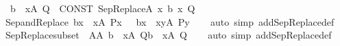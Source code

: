 \begin{isabellebody}
\isamarkupfalse%
\isanewline
\ \ {\isachardoublequoteopen}{\isacharbraceleft}{\kern0pt}b\ {\isachardot}{\kern0pt}{\isachardot}{\kern0pt}\ x{\isasymin}A{\isacharcomma}{\kern0pt}\ Q{\isacharbraceright}{\kern0pt}{\isachardoublequoteclose}\ {\isacharequal}{\kern0pt}{\isachargreater}{\kern0pt}\ {\isachardoublequoteopen}CONST\ SepReplace{\isacharparenleft}{\kern0pt}A{\isacharcomma}{\kern0pt}\ {\isasymlambda}x{\isachardot}{\kern0pt}\ b{\isacharcomma}{\kern0pt}\ {\isasymlambda}x{\isachardot}{\kern0pt}\ Q{\isacharparenright}{\kern0pt}{\isachardoublequoteclose}\isanewline
\isanewline
{}\isamarkupfalse%
\ Sep{\isacharunderscore}{\kern0pt}and{\isacharunderscore}{\kern0pt}Replace{\isacharcolon}{\kern0pt}\ {\isachardoublequoteopen}{\isacharbraceleft}{\kern0pt}b{\isacharparenleft}{\kern0pt}x{\isacharparenright}{\kern0pt}\ {\isachardot}{\kern0pt}{\isachardot}{\kern0pt}\ x{\isasymin}A{\isacharcomma}{\kern0pt}\ P{\isacharparenleft}{\kern0pt}x{\isacharparenright}{\kern0pt}\ {\isacharbraceright}{\kern0pt}\ {\isacharequal}{\kern0pt}\ {\isacharbraceleft}{\kern0pt}b{\isacharparenleft}{\kern0pt}x{\isacharparenright}{\kern0pt}\ {\isachardot}{\kern0pt}\ x{\isasymin}{\isacharbraceleft}{\kern0pt}y{\isasymin}A{\isachardot}{\kern0pt}\ P{\isacharparenleft}{\kern0pt}y{\isacharparenright}{\kern0pt}{\isacharbraceright}{\kern0pt}{\isacharbraceright}{\kern0pt}{\isachardoublequoteclose}\isanewline
%
\isadelimproof
\ \ %
\endisadelimproof
%
\isatagproof
{}\isamarkupfalse%
\ {\isacharparenleft}{\kern0pt}auto\ simp\ add{\isacharcolon}{\kern0pt}SepReplace{\isacharunderscore}{\kern0pt}def{\isacharparenright}{\kern0pt}%
\endisatagproof
{\isafoldproof}%
%
\isadelimproof
\isanewline
%
\endisadelimproof
\isanewline
{}\isamarkupfalse%
\ SepReplace{\isacharunderscore}{\kern0pt}subset\ {\isacharcolon}{\kern0pt}\ {\isachardoublequoteopen}A{\isasymsubseteq}A{\isacharprime}{\kern0pt}{\isasymLongrightarrow}\ {\isacharbraceleft}{\kern0pt}b\ {\isachardot}{\kern0pt}{\isachardot}{\kern0pt}\ x{\isasymin}A{\isacharcomma}{\kern0pt}\ Q{\isacharbraceright}{\kern0pt}{\isasymsubseteq}{\isacharbraceleft}{\kern0pt}b\ {\isachardot}{\kern0pt}{\isachardot}{\kern0pt}\ x{\isasymin}A{\isacharprime}{\kern0pt}{\isacharcomma}{\kern0pt}\ Q{\isacharbraceright}{\kern0pt}{\isachardoublequoteclose}\isanewline
%
\isadelimproof
\ \ %
\endisadelimproof
%
\isatagproof
{}\isamarkupfalse%
\ {\isacharparenleft}{\kern0pt}auto\ simp\ add{\isacharcolon}{\kern0pt}SepReplace{\isacharunderscore}{\kern0pt}def{\isacharparenright}{\kern0pt}%
\endisatagproof
{\isafoldproof}%

\end{isabellebody}
